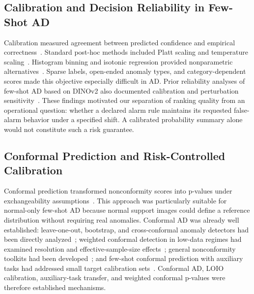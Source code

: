 \subsection{Calibration and Decision Reliability in Few-Shot AD}
Calibration measured agreement between predicted confidence and empirical correctness~\cite{platt1999,guo2017calibration}. Standard post-hoc methods included Platt scaling and temperature scaling~\cite{platt1999,guo2017calibration}. Histogram binning and isotonic regression provided nonparametric alternatives~\cite{zadrozny2001obtaining,zadrozny2002transforming}. Sparse labels, open-ended anomaly types, and category-dependent scores made this objective especially difficult in AD\@. Prior reliability analyses of few-shot AD based on DINOv2 also documented calibration and perturbation sensitivity~\cite{khan2025calibration}. These findings motivated our separation of ranking quality from an operational question: whether a declared alarm rule maintains its requested false-alarm behavior under a specified shift. A calibrated probability summary alone would not constitute such a risk guarantee.

\subsection{Conformal Prediction and Risk-Controlled Calibration}
Conformal prediction transformed nonconformity scores into p-values under exchangeability assumptions~\cite{vovk2005,shafer2008tutorial,angelopoulos2021gentle}. This approach was particularly suitable for normal-only few-shot AD because normal support images could define a reference distribution without requiring real anomalies. Conformal AD was already well established: leave-one-out, bootstrap, and cross-conformal anomaly detectors had been directly analyzed~\cite{hennhofer2024loio}; weighted conformal detection in low-data regimes had examined resolution and effective-sample-size effects~\cite{hennhofer2026weighted}; general nonconformity toolkits had been developed~\cite{hennhofer2026nonconform}; and few-shot conformal prediction with auxiliary tasks had addressed small target calibration sets~\cite{fisch2021fewshot}. Conformal AD, LOIO calibration, auxiliary-task transfer, and weighted conformal p-values were therefore established mechanisms.

